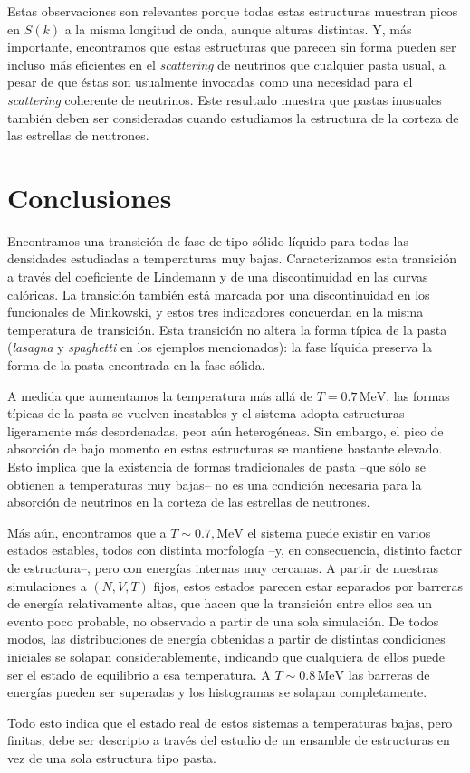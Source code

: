 Estas observaciones son relevantes porque todas estas estructuras muestran picos en $S(k)$ a la misma longitud de onda, aunque alturas distintas.
Y, más importante, encontramos que estas estructuras que parecen sin forma pueden ser incluso más eficientes en el \emph{scattering} de neutrinos que cualquier pasta usual, a pesar de que éstas son usualmente invocadas como una necesidad para el \emph{scattering} coherente de neutrinos.
Este resultado muestra que pastas inusuales también deben ser consideradas cuando estudiamos la estructura de la corteza de las estrellas de neutrones.

\section{Conclusiones}
\label{discussion}

Encontramos una transición de fase de tipo sólido-líquido para todas las densidades estudiadas a temperaturas muy bajas.
Caracterizamos esta transición a través del coeficiente de Lindemann y de una discontinuidad en las curvas calóricas.
La transición también está marcada por una discontinuidad en los funcionales de Minkowski, y estos tres indicadores concuerdan en la misma temperatura de transición.
Esta transición no altera la forma típica de la pasta (\emph{lasagna} y \emph{spaghetti}
en los ejemplos mencionados): la fase líquida preserva la forma de la pasta encontrada en la fase sólida.

A medida que aumentamos la temperatura más allá de $T=0.7\,\text{MeV}$, las formas típicas de la pasta se vuelven inestables y el sistema adopta estructuras ligeramente más desordenadas, peor aún heterogéneas.
Sin embargo, el pico de absorción de bajo momento en estas estructuras se mantiene bastante elevado.
Esto implica que la existencia de formas tradicionales de pasta --que sólo se obtienen a temperaturas muy bajas-- no es una condición necesaria para la absorción de neutrinos en la corteza de las estrellas de neutrones.

Más aún, encontramos que a $T\sim0.7,\text{MeV}$ el sistema puede existir en varios estados estables, todos con distinta morfología --y, en consecuencia, distinto factor de estructura--, pero con energías internas muy cercanas.
A partir de nuestras simulaciones a $(N,V,T)$ fijos, estos estados parecen estar separados por barreras de energía relativamente altas, que hacen que la transición entre ellos sea un evento poco probable, no observado a partir de una sola simulación.
De todos modos, las distribuciones de energía obtenidas a partir de distintas condiciones iniciales se solapan considerablemente, indicando que cualquiera de ellos puede ser el estado de equilibrio a esa temperatura.
A $T\sim0.8\,\text{MeV}$ las barreras de energías pueden ser superadas y los histogramas se solapan completamente.

Todo esto indica que el estado real de estos sistemas a temperaturas bajas, pero finitas, debe ser descripto a través del estudio de un ensamble de estructuras en vez de una sola estructura tipo pasta.
